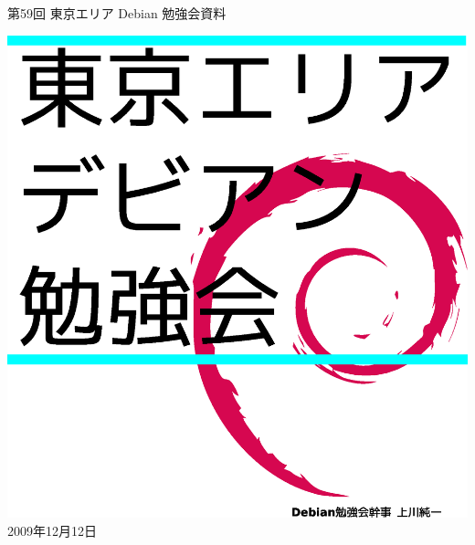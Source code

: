 \documentclass[mingoth,a4paper]{jsarticle}
\newcommand{\debmtgyear}{2009}
\newcommand{\debmtgmonth}{12}
\newcommand{\debmtgdate}{12}
\newcommand{\debmtgnumber}{59}
\begin{document}
\begin{titlepage}
\thispagestyle{empty}


\vspace*{-2cm}
第\debmtgnumber{}回 東京エリア Debian 勉強会資料

\hspace*{-2.4cm}
\includegraphics[width=210mm]{image200801/2008title.eps}\\
\hfill{}\debmtgyear{}年\debmtgmonth{}月\debmtgdate{}日

\end{titlepage}


\end{document}
